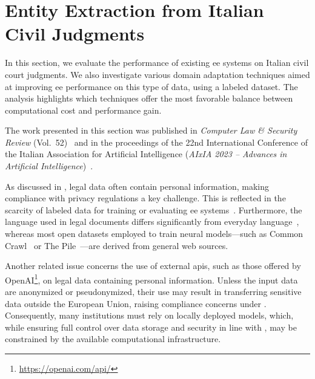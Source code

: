 \section{Entity Extraction from Italian Civil Judgments}
\label{sec:eejudgements}


In this section, we evaluate the performance of existing \ac{ee} systems on Italian civil court judgments. We also investigate various domain adaptation techniques aimed at improving \ac{ee} performance on this type of data, using a labeled dataset. The analysis highlights which techniques offer the most favorable balance between computational cost and performance gain.

The work presented in this section was published in \emph{Computer Law \& Security Review} (Vol.~52)~\cite{BELLANDI2024} and in the proceedings of the 22nd International Conference of the Italian Association for Artificial Intelligence (\emph{AIxIA 2023 -- Advances in Artificial Intelligence})~\cite{aixia_2023}.

As discussed in , legal data often contain personal information, making compliance with privacy regulations a key challenge. This is reflected in the scarcity of labeled data for training or evaluating \ac{ee} systems~\cite{li-etal-2022-parameter}. Furthermore, the language used in legal documents differs significantly from everyday language~\cite{ccetindaug2023name_legal_turkish}, whereas most open datasets employed to train neural models---such as Common Crawl~\cite{commoncrawl} or The Pile~\cite{gao2020pile800gbdatasetdiverse}---are derived from general web sources.

Another related issue concerns the use of external \acp{api}, such as those offered by OpenAI\footnote{\url{https://openai.com/api/}}, on legal data containing personal information. Unless the input data are anonymized or pseudonymized, their use may result in transferring sensitive data outside the European Union, raising compliance concerns under \textcite[Art.~44--49]{gdpr2016}. Consequently, many institutions must rely on locally deployed models, which, while ensuring full control over data storage and security in line with \textcite[Art.~32]{gdpr2016}, may be constrained by the available computational infrastructure.

